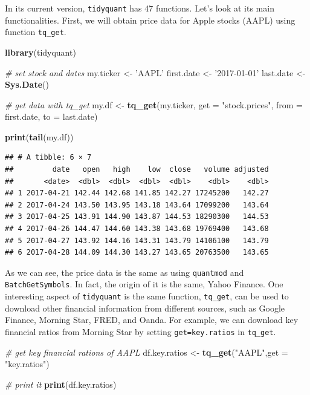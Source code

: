 \documentclass[11pt,]{book}
\newenvironment{Shaded}{\begin{snugshade}}{\end{snugshade}}
\newcommand{\KeywordTok}[1]{\textcolor[rgb]{0.27,0.27,0.27}{\textbf{#1}}}
\newcommand{\DataTypeTok}[1]{\textcolor[rgb]{0.27,0.27,0.27}{#1}}
\newcommand{\StringTok}[1]{\textcolor[rgb]{0.5,0.5,0.5}{#1}}
\newcommand{\CommentTok}[1]{\textcolor[rgb]{0.56,0.35,0.01}{\textit{#1}}}
\newcommand{\NormalTok}[1]{#1}
\begin{document}
In its current version, \texttt{tidyquant} has 47 functions. Let's look
at its main functionalities. First, we will obtain price data for Apple
stocks (AAPL) using function \texttt{tq\_get}.

\begin{Shaded}
\begin{Highlighting}[]
\KeywordTok{library}\NormalTok{(tidyquant)}

\CommentTok{# set stock and dates}
\NormalTok{my.ticker <-}\StringTok{ 'AAPL'}
\NormalTok{first.date <-}\StringTok{ '2017-01-01'}
\NormalTok{last.date <-}\StringTok{  }\KeywordTok{Sys.Date}\NormalTok{()}

\CommentTok{# get data with tq_get}
\NormalTok{my.df <-}\StringTok{ }\KeywordTok{tq_get}\NormalTok{(my.ticker,}
                \DataTypeTok{get =} \StringTok{"stock.prices"}\NormalTok{, }
                \DataTypeTok{from =}\NormalTok{ first.date, }
                \DataTypeTok{to =}\NormalTok{ last.date)}

\KeywordTok{print}\NormalTok{(}\KeywordTok{tail}\NormalTok{(my.df))}
\end{Highlighting}
\end{Shaded}

\begin{verbatim}
## # A tibble: 6 × 7
##         date   open   high    low  close   volume adjusted
##       <date>  <dbl>  <dbl>  <dbl>  <dbl>    <dbl>    <dbl>
## 1 2017-04-21 142.44 142.68 141.85 142.27 17245200   142.27
## 2 2017-04-24 143.50 143.95 143.18 143.64 17099200   143.64
## 3 2017-04-25 143.91 144.90 143.87 144.53 18290300   144.53
## 4 2017-04-26 144.47 144.60 143.38 143.68 19769400   143.68
## 5 2017-04-27 143.92 144.16 143.31 143.79 14106100   143.79
## 6 2017-04-28 144.09 144.30 143.27 143.65 20763500   143.65
\end{verbatim}

As we can see, the price data is the same as using \texttt{quantmod} and
\texttt{BatchGetSymbols}. In fact, the origin of it is the same, Yahoo
Finance. One interesting aspect of \texttt{tidyquant} is the same
function, \texttt{tq\_get}, can be used to download other financial
information from different sources, such as Google Finance, Morning
Star, FRED, and Oanda. For example, we can download key financial ratios
from Morning Star by setting
\texttt{get=\textquotesingle{}key.ratios\textquotesingle{}} in
\texttt{tq\_get}. 

\begin{Shaded}
\begin{Highlighting}[]
\CommentTok{# get key financial rations of AAPL}
\NormalTok{df.key.ratios <-}\StringTok{ }\KeywordTok{tq_get}\NormalTok{(}\StringTok{"AAPL"}\NormalTok{,}\DataTypeTok{get =} \StringTok{"key.ratios"}\NormalTok{)}

\CommentTok{# print it}
\KeywordTok{print}\NormalTok{(df.key.ratios)           }
\end{Highlighting}
\end{Shaded}
\end{document}
